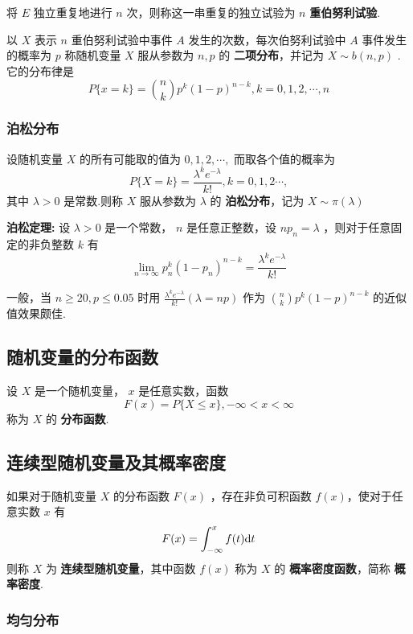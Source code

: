 \documentclass[UTF8,10pt]{ctexart}
\begin{document}
	将 $ E $ 独立重复地进行 $ n $ 次，则称这一串重复的独立试验为 $ n $ \textbf{重伯努利试验}.
	
	以 $ X $ 表示 $ n $ 重伯努利试验中事件 $ A $ 发生的次数，每次伯努利试验中 $ A $ 事件发生的概率为 $ p $ 称随机变量 $ X $ 服从参数为 $ n,p $ 的 \textbf{二项分布}，并记为 $ X \sim b(n,p)$ .它的分布律是 $$ P\{x=k\}=\binom{n}{k}p^{k}(1-p)^{n-k},k=0,1,2, \cdots ,n $$ 
	
	\subsubsection{泊松分布}
	
	设随机变量 $ X $ 的所有可能取的值为 $0,1,2, \cdots,$ 而取各个值的概率为 $$ P\{X=k\}= \frac{ \lambda ^{k}e^{- \lambda } }{k!},k=0,1,2 \cdots , $$ 其中 $ \lambda >0$ 是常数.则称 $ X $ 服从参数为 $ \lambda $ 的 \textbf{泊松分布}，记为 $ X \sim \pi( \lambda ) $ 
	
	\textbf{泊松定理:} 设 $ \lambda >0 $ 是一个常数， $ n $ 是任意正整数，设 $ np_{n}= \lambda $ ，则对于任意固定的非负整数 $ k $ 有 $$ \lim\limits_{n \to \infty}p_{n}^{k}(1-p_{n})^{n-k}= \frac{ \lambda ^{k}e^{- \lambda }}{k!} $$ 
	
	一般，当 $ n \ge 20,p \le 0.05 $ 时用 $ \frac{ \lambda ^{k}e^{- \lambda }}{k!}( \lambda =np) $ 作为 $ \binom{n}{k} p^{k}(1-p)^{n-k} $ 的近似值效果颇佳.
	
	\subsection{随机变量的分布函数}
	
	设 $ X $ 是一个随机变量， $ x $ 是任意实数，函数 $$ F(x)=P\{X \le x\},- \infty <x< \infty $$ 称为 $ X $ 的 \textbf{分布函数}.
	
	\subsection{连续型随机变量及其概率密度}
	
	如果对于随机变量 $ X $ 的分布函数 $ F(x) $ ，存在非负可积函数 $ f(x) $，使对于任意实数 $ x $ 有 $$ F(x)= \int_{- \infty }^{x}f(t) {\rm d}t $$ 则称 $ X $ 为 \textbf{连续型随机变量}，其中函数 $ f(x) $ 称为 $ X $ 的 \textbf{概率密度函数}，简称 \textbf{概率密度}.
	
	\subsubsection{均匀分布}
	
\end{document}
